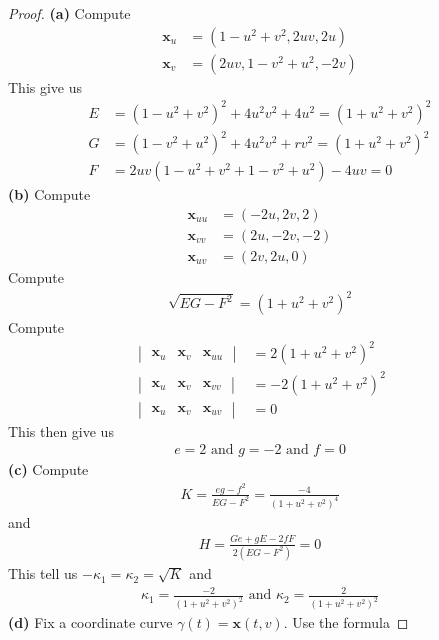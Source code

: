 \documentclass{report}
\begin{document}
\begin{proof}
\textbf{(a)}
Compute 
\begin{align*}
\textbf{x}_u&=(1-u^2+v^2, 2uv, 2u)\\
\textbf{x}_v&=(2uv, 1-v^2+u^2, -2v)
\end{align*}
This give us 
\begin{align*}
E&= (1-u^2+v^2)^2 + 4u^2v^2+4u^2= (1+u^2+v^2)^2\\
G&=(1-v^2+u^2)^2 + 4u^2v^2 + rv^2= (1+u^2+v^2)^2\\
F&=2uv(1-u^2+v^2+1-v^2+u^2)-4uv=0
\end{align*}
\textbf{(b)}
Compute 
\begin{align*}
\textbf{x}_{uu}&=(-2u,2v,2)\\
\textbf{x}_{vv}&=(2u,-2v,-2)\\
\textbf{x}_{uv}&=(2v,2u,0)
\end{align*}
Compute 
\begin{align*}
\sqrt{EG-F^2}=(1+u^2+v^2)^2 
\end{align*}
Compute 
\begin{align*}
\begin{vmatrix} 
  \textbf{x}_u & \textbf{x}_{v} & \textbf{x}_{uu}
\end{vmatrix}&=2(1+u^2+v^2)^2\\
\begin{vmatrix}
  \textbf{x}_u & \textbf{x}_v & \textbf{x}_{vv}
\end{vmatrix}&=-2(1+u^2+v^2)^2\\
\begin{vmatrix}
  \textbf{x}_u & \textbf{x}_v & \textbf{x}_{uv}
\end{vmatrix}&=0
\end{align*}
This then give us 
\begin{align*}
e=2\text{ and }g=-2\text{ and }f=0
\end{align*}
\textbf{(c)}
Compute 
\begin{align*}
K= \frac{eg-f^2}{EG-F^2}= \frac{-4}{(1+u^2+v^2)^4}
\end{align*}
and 
\begin{align*}
H= \frac{Ge+gE-2fF}{2(EG-F^2)}= 0
\end{align*}
This tell us $-\kappa_1 =\kappa_2=\sqrt{K}$ and 
\begin{align*}
\kappa_1 = \frac{-2}{(1+u^2+v^2)^2}\text{ and }\kappa_2=\frac{2}{(1+u^2+v^2)^2}
\end{align*}
\textbf{(d)}
Fix a coordinate curve $\gamma (t)=\textbf{x}(t,v)$. Use the formula 

\end{proof}
\end{document}

